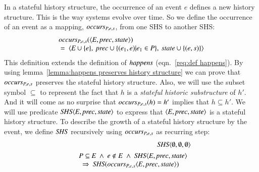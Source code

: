 \documentclass{elsarticle}
\def\id#1{\text{\em #1\/}}
\def\Events{{\mathit E}}
\begin{document}
	In a stateful history structure, the occurrence of an event $e$ defines a new history structure.
	This is the way systems evolve over time.
	So we define the occurrence of an event as a mapping, $\id{occurs}_{P,e,s}$, from one SHS to another SHS:
\begin{equation}
\begin{array}{l}
	\id{occurs}_{P,e,s}(\la \Events, \id{prec}, \id{state}\ra)\\
	\ =\ \la \Events\cup\{e\},\ \id{prec}\cup\{(e_1,e) | e_1\in P\},\ \id{state}\cup\{(e,s)\}\ra
\end{array}	
\label{eqn:def occurs}
\end{equation}
	This definition extends the definition of $\id{happens}$ (eqn.~\ref{req:def happens}).
	By using lemma~\ref{lemma:happens preserves history structure} we can prove that $\id{occurs}_{P,e,s}$ preserves
	the stateful history structure.
	Also, we will use the subset symbol $\subseteq$ to represent the fact that $h$ is a {\em stateful historic substructure} of $h'$.
	And it will come as no surprise that $\id{occurs}_{P,e,s}(h)=h'$ implies that $h\subseteq h'$.
	We will use predicate $\id{SHS}\la \Events, \id{prec}, \id{state}\ra$
	to express that $\la \Events, \id{prec}, \id{state}\ra$ is a stateful history structure.
	To describe the growth of a stateful history structure by the event,
	we define $\id{SHS}$ recursively using $\id{occurs}_{P,e,s}$ as recurring step:
\begin{eqnarray}
	&&\id{SHS}\la \emptyset, \emptyset, \emptyset\ra\\
&&\begin{array}{@{}l}
	P\subseteq\Events\ \wedge\ e\notin E\ \wedge\ \id{SHS}\la \Events, \id{prec}, \id{state}\ra\\
	\ \ \Rightarrow\ \id{SHS}(\id{occurs}_{P,e,s}\la \Events, \id{prec}, \id{state}\ra)
\end{array}
\label{req:recursive def occurs}
\end{eqnarray}
\end{document}

